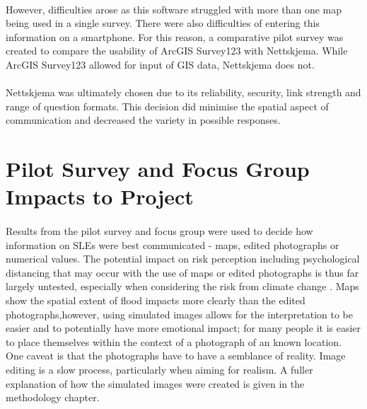 \paragraph{}

However, difficulties arose as this software struggled with more than one map being used in a single survey. There were also difficulties of entering this information on a smartphone. For this reason, a comparative pilot survey was created to compare the usability of ArcGIS Survey123 with Nettskjema. While ArcGIS Survey123 allowed for input of GIS data, Nettskjema does not.
\paragraph{}
Nettskjema was ultimately chosen due to its reliability, security, link strength and range of question formats.  This decision did minimise the spatial aspect of communication and decreased the variety in possible responses.

\section{Pilot Survey and Focus Group Impacts to Project}
 
\paragraph{}
Results from the pilot survey and focus group were used to decide how information on SLEs were best communicated - maps, edited photographs or numerical values. The potential impact on risk perception  including psychological distancing that may occur with the use of maps or edited photographs is thus far largely untested, especially when considering the risk from climate change \cite{retchless_understanding_2018} \cite{spence_psychological_2012}. Maps show the spatial extent of flood impacts more clearly than the edited photographs,however, using simulated images allows for the interpretation to be easier and to potentially have more emotional impact; for many people it is easier to place themselves within the context of a photograph of an known location. One caveat is that the photographs have to have a semblance of reality. Image editing is a slow process, particularly when aiming for realism.  A fuller explanation of how the simulated images were created is given in the methodology chapter. 
\paragraph{}

